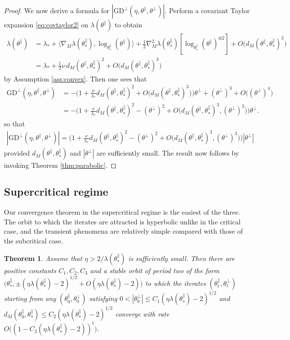 \documentclass{article}
\newcommand{\tpa}{\theta^{\parallel}}
\newcommand{\tpe}{\theta^{\perp}}
\newcommand{\GD}{\mathrm{GD}}
\theoremstyle{plain}
\newtheorem{theorem}{Theorem}[section]
\theoremstyle{definition}
\theoremstyle{remark}
\begin{document}
\begin{proof}
    We now derive a formula for $|\GD^{\perp}(\eta,\tpa,\tpe)|$. Perform a covariant Taylor expansion \eqref{eq:covtaylor2} on $\lambda(\tpa)$ to obtain
    \begin{align}
        \lambda(\tpa) &= \lambda_* + \langle \nabla_M\lambda(\tpa_*),\log_{\tpa_*}(\tpa)\rangle + \frac{1}{2}\nabla^2_M\lambda(\tpa_*)[\log_{\tpa_*}(\tpa)^{\otimes2}] + O\big(d_M(\tpa,\tpa_*)^3\big)\\&=\lambda_* + \frac{1}{2}\nu\,d_M(\tpa,\tpa_*)^2 + O\big(d_M(\tpa,\tpa_*)^3\big)
    \end{align}
    by Assumption \ref{ass:convex}. Then one sees that
    \begin{align}
        \GD^{\perp}(\eta,\tpa,\tpe) &= -\bigg(1+\frac{\nu}{\lambda_*}d_M(\tpa,\tpa_*)^2 + O\big(d_M(\tpa,\tpa_*)^3\big)\bigg)\tpe + (\tpe)^3 + O\big((\tpe)^4\big)\\&=-\bigg(1+\frac{\nu}{\lambda_*}d_M(\tpa,\tpa_*)^2 - (\tpe)^2 + O\big(d_M(\tpa,\tpa_*)^3, (\tpe)^3\big)\bigg)\tpe.
    \end{align}
    so that
    \begin{align}
        |\GD^{\perp}(\eta,\tpa,\tpe)| = \bigg(1+\frac{\nu}{\lambda_*}d_M(\tpa,\tpa_*)^2 - (\tpe)^2 + O\big(d_M(\tpa,\tpa_*)^3, (\tpe)^3\big)\bigg)|\tpe|
    \end{align}
    provided $d_M(\tpa,\tpa_*)$ and $|\tpe|$ are sufficiently small. The result now follows by invoking Theorem \ref{thm:parabolic}.
\end{proof}

\subsection{Supercritical regime}

Our convergence theorem in the supercritical regime is the easiest of the three. The orbit to which the iterates are attracted is hyperbolic unlike in the critical case, and the transient phenomena are relatively simple compared with those of the subcritical case.

\begin{theorem}\label{thm:supercrit}
    Assume that $\eta>2/\lambda(\tpa_*)$ is sufficiently small. Then there are positive constants $C_1, C_2,C_3$ and a stable orbit of period two of the form $\big(\tpa_*,\pm(\eta\lambda(\tpa_*)-2)^{1/2}+O(\eta\lambda(\tpa_*)-2)\big)$ to which the iterates $(\tpa_t,\tpe_t)$ starting from any $(\tpa_0,\tpe_0)$ satisfying $0<|\tpe_0|\leq C_1(\eta\lambda(\tpa_*)-2)^{1/2}$ and $d_M(\tpa_0,\tpa_*)\leq C_2(\eta\lambda(\tpa_*)-2)^{1/2}$ converge with rate $O\big((1-C_3(\eta\lambda(\tpa_*)-2))^t\big)$.
\end{theorem}
\end{document}
